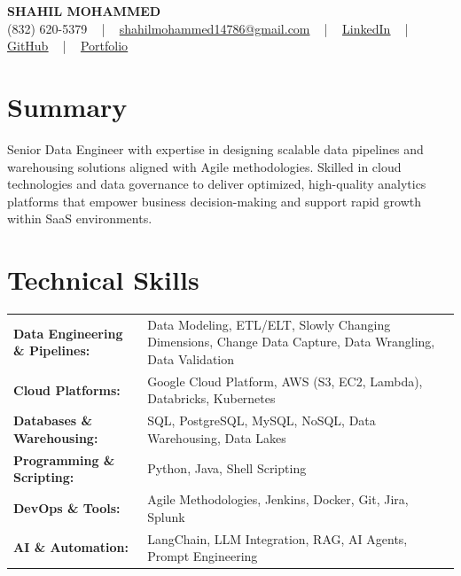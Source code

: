 \documentclass[letterpaper,11pt]{article}
\begin{document}
\begin{center}
    {\fontsize{14pt}{12pt}\selectfont \textbf{\MakeUppercase{Shahil Mohammed}}}\\ \vspace{2pt}
    \fontsize{10pt}{12pt}\selectfont (832) 620-5379 ~ | ~ \href{mailto:shahilmohammed14786@gmail.com}{shahilmohammed14786@gmail.com} ~ | ~  
    \href{https://www.linkedin.com/in/shahil-mohammed-9652931a1/}{\color{blue}\underline{LinkedIn}}  ~ | ~ 
    \href{https://github.com/freakbeast14}{\color{blue}\underline{GitHub}} ~ | ~ 
    \href{https://shahil-mohammed.netlify.app/}{\color{blue}\underline{Portfolio}}
    \vspace{-8pt}
\end{center}

\section{Summary}
\fontsize{9pt}{10pt}\selectfont
Senior Data Engineer with expertise in designing scalable data pipelines and warehousing solutions aligned with Agile methodologies. Skilled in cloud technologies and data governance to deliver optimized, high-quality analytics platforms that empower business decision-making and support rapid growth within SaaS environments.
 \vspace{-5pt}
 
\section{Technical Skills}
        \vspace{-14pt}
        \begin{table}[h]
            \fontsize{9pt}{10pt}\selectfont
            \begin{tabular}{p{0.3\linewidth} p{0.7\linewidth}}
                \textbf{Data Engineering \& Pipelines:} & Data Modeling, ETL/ELT, Slowly Changing Dimensions, Change Data Capture, Data Wrangling, Data Validation \\
                \textbf{Cloud Platforms:} & Google Cloud Platform, AWS (S3, EC2, Lambda), Databricks, Kubernetes \\
                \textbf{Databases \& Warehousing:} & SQL, PostgreSQL, MySQL, NoSQL, Data Warehousing, Data Lakes \\
                \textbf{Programming \& Scripting:} & Python, Java, Shell Scripting \\
                \textbf{DevOps \& Tools:} & Agile Methodologies, Jenkins, Docker, Git, Jira, Splunk \\
                \textbf{AI \& Automation:} & LangChain, LLM Integration, RAG, AI Agents, Prompt Engineering \\
            \end{tabular}
        \end{table}
 \vspace{-15pt}
 
\end{document}
